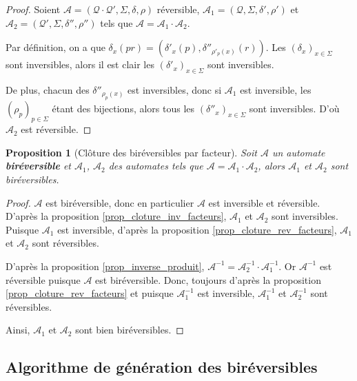 \documentclass[11pt,a4paper]{article}
\newtheorem{prop}{Proposition}
\begin{document}
\begin{proof}
  Soient $\mathcal{A}=\left(\mathcal{Q\cdot Q'}, \Sigma, \delta, \rho\right)$ réversible, $\mathcal{A}_1=\left(\mathcal{Q}, \Sigma, \delta', \rho'\right)$ et $\mathcal{A}_2=\left(\mathcal{Q'}, \Sigma, \delta'', \rho''\right)$ tels que $\mathcal{A} = \mathcal{A}_1\cdot\mathcal{A}_2$.

  Par définition, on a que $\delta_x(pr) = (\delta'_x(p), \delta''_{\rho'_p(x)}(r))$. Les ${(\delta_x)}_{x\in\Sigma}$ sont inversibles, alors il est clair les ${(\delta'_x)}_{x\in\Sigma}$ sont inversibles.

  De plus, chacun des $\delta''_{\rho_p(x)}$ est inversibles, donc si $\mathcal{A}_1$ est inversible, les ${(\rho_p)}_{p\in\Sigma}$ étant des bijections, alors tous les ${(\delta''_x)}_{x\in\Sigma}$ sont inversibles. D'où $\mathcal{A}_2$ est réversible.
\end{proof}

\begin{prop}[Clôture des biréversibles par facteur]
  Soit $\mathcal{A}$ un automate \textbf{biréversible} et $\mathcal{A}_1$, $\mathcal{A}_2$ des automates tels que $\mathcal{A}=\mathcal{A}_1\cdot\mathcal{A}_2$, alors $\mathcal{A}_1$ et $\mathcal{A}_2$ sont biréversibles.
\end{prop}

\begin{proof}
    $\mathcal{A}$ est biréversible, donc en particulier $\mathcal{A}$ est inversible et réversible. D'après la proposition \ref{prop_cloture_inv_facteurs}, $\mathcal{A}_1$ et $\mathcal{A}_2$ sont inversibles. Puisque $\mathcal{A}_1$ est inversible, d'après la proposition \ref{prop_cloture_rev_facteurs}, $\mathcal{A}_1$ et $\mathcal{A}_2$ sont réversibles.

    D'après la proposition \ref{prop_inverse_produit}, $\mathcal{A}^{-1} = \mathcal{A}_2^{-1} \cdot \mathcal{A}_1^{-1}$. Or $\mathcal{A}^{-1}$ est réversible puisque $\mathcal{A}$ est biréversible. Donc, toujours d'après la proposition \ref{prop_cloture_rev_facteurs} et puisque $\mathcal{A}_1^{-1}$ est inversible, $\mathcal{A}_1^{-1}$ et $\mathcal{A}_2^{-1}$ sont réversibles.

    Ainsi, $\mathcal{A}_1$ et $\mathcal{A}_2$ sont bien biréversibles.
\end{proof}

\subsection{Algorithme de génération des biréversibles\label{sec:gen}}
\end{document}
